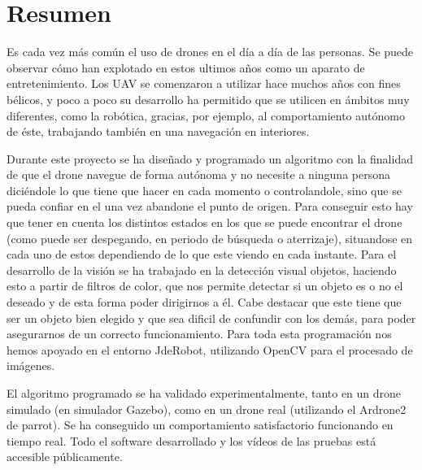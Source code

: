 \chapter*{Resumen}
\hspace{1cm} Es cada vez m\'as com\'un el uso de drones en el d\'ia a d\'ia de las personas. Se puede observar c\'omo han explotado en estos ultimos años como un aparato de entretenimiento. Los UAV se comenzaron a utilizar hace muchos años con fines b\'elicos, y poco a poco su desarrollo ha permitido que se utilicen en \'ambitos muy diferentes, como la rob\'otica, gracias, por ejemplo, al comportamiento aut\'onomo de \'este, trabajando tambi\'en en una navegaci\'on en interiores. 

\hspace{1cm} Durante este proyecto se ha diseñado y programado un algoritmo con la finalidad de que el drone navegue de forma aut\'onoma y no necesite a ninguna persona dici\'endole lo que tiene que hacer en cada momento o controlandole, sino que se pueda confiar en el una vez abandone el punto de origen. Para conseguir esto hay que tener en cuenta los distintos estados en los que se puede encontrar el drone (como puede ser despegando, en periodo de b\'usqueda o aterrizaje), situandose en cada uno de estos dependiendo de lo que este viendo en cada instante. Para el desarrollo de la visi\'on se ha trabajado en la detecci\'on visual objetos, haciendo esto a partir de filtros de color, que nos permite detectar si un objeto es o no el deseado y de esta forma poder dirigirnos a \'el. Cabe destacar que este tiene que ser un objeto bien elegido y que sea dificil de confundir con los dem\'as, para poder asegurarnos de un correcto funcionamiento. Para toda esta programaci\'on nos hemos apoyado en el entorno JdeRobot, utilizando OpenCV para el procesado de im\'agenes.

\hspace{1cm} El algoritmo programado se ha validado experimentalmente, tanto en un drone simulado (en simulador Gazebo), como en un drone real (utilizando el Ardrone2 de parrot). Se ha conseguido un comportamiento satisfactorio funcionando en tiempo real. Todo el software desarrollado y los v\'ideos de las pruebas est\'a accesible p\'ublicamente. 


 

